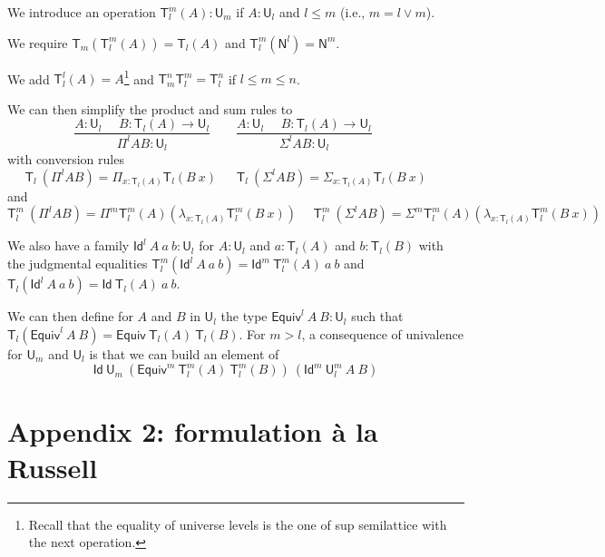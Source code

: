 \documentclass[11pt,a4paper]{article}
\theoremstyle{definition}
\newcommand{\Id}{\mathsf{Id}}
\newcommand{\NN}{\mathsf{N}}
\newcommand{\UU}{\mathsf{U}}
\newcommand{\mypi}[3]{\Pi_{#1:#2}#3}
\newcommand{\mylam}[3]{\lambda_{#1:#2}#3}
\newcommand{\mysig}[3]{\Sigma_{#1:#2}#3}
\newcommand{\T}{\mathsf{T}}
\newcommand{\Equiv}{\mathsf{Equiv}}
\begin{document}


We introduce an operation $\T_{l}^{m}(A):\UU_{m}$ if $A:\UU_{l}$
and $l\leqslant m$ (i.e., $m = l\vee m$).

We require $\T_{m}(\T_{l}^{m}(A)) = \T_{l}(A)$
and $\T_{l}^{m}(\NN^{l}) = \NN^{m}$.

We add $\T_{l}^l(A) = A$\footnote{Recall that the equality of universe levels is the one of
  sup semilattice with the next operation.}
and $\T_{m}^n\T_{l}^m = \T_l^n$ if $l\leqslant m\leqslant n$.

We can then simplify the product and sum rules to
$$
\frac{A:\UU_{l}~~~~~~B:\T_{l}(A)\rightarrow \UU_{l}}
     {\Pi^{l} A B:\UU_{l}}~~~~~~~~~
\frac{A:\UU_{l}~~~~~~B:\T_{l}(A)\rightarrow \UU_{l}}
     {\Sigma^{l} A B:\UU_{l}}~~~~~~~~~
$$
with conversion rules
$$
\T_{l}~(\Pi^{l} A B) = \mypi{x}{\T_{l}(A)}{ \T_{l}(B~x)}~~~~~~~
\T_{l}~(\Sigma^{l} A B) =  \mysig{x}{\T_{l}(A)}{ \T_{l}(B~x)}~~~~~~~
$$
and
$$
\T_{l}^{m}~(\Pi^{l} A B) = \Pi^{m} \T_{l}^{m}(A) (\mylam {x}{\T_{l}(A)}{\T_{l}^{m}(B~x)})~~~~~~
\T_{l}^{m}~(\Sigma^{l} A B) = \Sigma^{m} \T_{l}^{m}(A) (\mylam {x}{\T_{l}(A)}{\T_{l}^{m}(B~x)})~~~~~~
$$

We also have a family $\Id^l~A~a~b:\UU_l$ for $A:\UU_l$ and $a:\T_l(A)$ and $b:\T_l(B)$
with the judgmental equalities $\T_l^m(\Id^l~A~a~b) = \Id^m~\T_l^m(A)~a~b$
and $\T_l(\Id^l~A~a~b) = \Id~\T_l(A)~a~b$.

\medskip

We can then define for $A$ and $B$ in $\UU_l$
the type $\Equiv^l~A~B:\UU_l$ such that
$\T_l(\Equiv^l~A~B) = \Equiv~\T_l(A)~\T_l(B)$. For $m>l$, a consequence of univalence
for $\UU_m$ and $\UU_l$ is that we can build an element of
$$
\Id~\UU_m~(\Equiv^m~\T^m_l(A)~\T^m_l(B))~(\Id^m~\UU^m_l~A~B)
$$

\section*{Appendix 2: formulation \`a la Russell}
\end{document}
